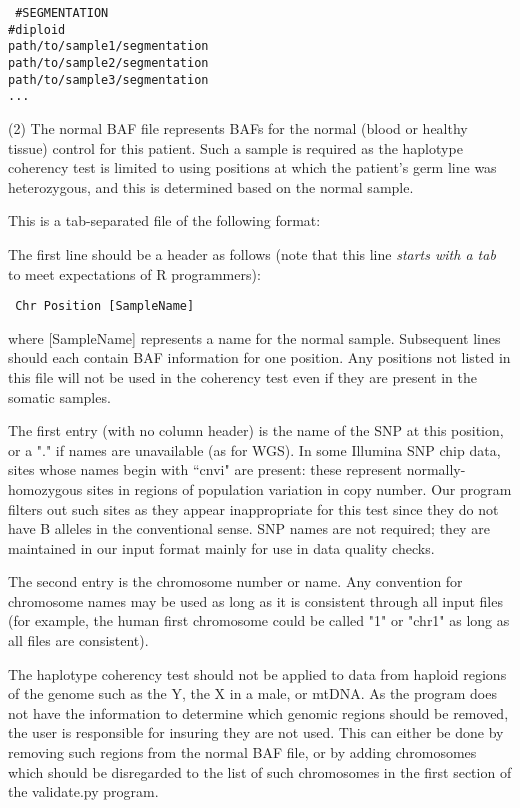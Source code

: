 \documentclass{article}
\begin{document}
{\flushleft
{\tt
\#SEGMENTATION \\
\#diploid \\
path/to/sample1/segmentation \\
path/to/sample2/segmentation \\
path/to/sample3/segmentation \\
...
}
}
\bigskip

(2)  The normal BAF file represents BAFs for the normal (blood or
healthy tissue) control for this patient.  Such a sample is required
as the haplotype coherency test is limited to using positions at which
the patient's germ line was heterozygous, and this is determined based
on the normal sample.

This is a tab-separated file of the following format:

The first line should be a header as follows (note that this line {\it starts with
a tab} to meet expectations of R programmers):

{\flushleft
{\tt
	Chr	Position	[SampleName] \\
}}

\bigskip

where [SampleName] represents a name for the normal sample.
Subsequent lines should each contain BAF information for one position.
Any positions not listed in this file will not be used in the
coherency test even if they are present in the somatic samples.

The first entry (with no column header) is the name of the SNP at
this position, or a "." if names are unavailable (as for WGS). 
In some Illumina SNP chip data, sites whose names begin with ``cnvi"
are present:  these represent normally-homozygous sites in regions of
population variation in copy number.  Our program filters out such
sites as they appear inappropriate for this test since they do
not have B alleles in the conventional sense.  SNP names are not
required; they are maintained in our input format mainly for 
use in data quality checks.

The second entry is the chromosome number or name. Any convention for
chromosome names may be used as long as it is consistent through all
input files (for example, the human first chromosome could be called
"1" or "chr1" as long as all files are consistent).

The haplotype coherency test should not be applied to data from haploid
regions of the genome such as the Y, the X in a male, or mtDNA.
As the program does not have the information to determine which
genomic regions should be removed, the user is responsible for 
insuring they are not used.  This can either be done by removing
such regions from the normal BAF file, or by adding chromosomes
which should be disregarded to the list of such chromosomes in
the first section of the validate.py program.
\end{document}
